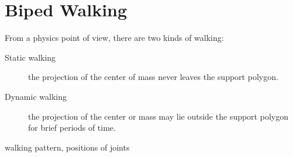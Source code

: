 \documentclass[a4paper]{report}
\begin{document}
\section{Biped Walking}
From a physics point of view, there are two kinds of walking:
\begin{description}
    \item[Static walking] the projection of the center of mass never leaves the support polygon.
    \item[Dynamic walking] the projection of the center or mass may lie outside the support polygon for brief periods of time.
\end{description}


walking pattern, positions of joints
\end{document}
